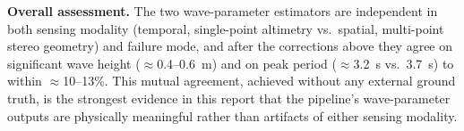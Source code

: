 \textbf{Overall assessment.} The two wave-parameter estimators are independent in both sensing modality (temporal, single-point altimetry vs.\ spatial, multi-point stereo geometry) and failure mode, and after the corrections above they agree on significant wave height ($\approx$0.4--0.6~m) and on peak period ($\approx$3.2~s vs.\ 3.7~s) to within $\approx$10--13\%. This mutual agreement, achieved without any external ground truth, is the strongest evidence in this report that the pipeline's wave-parameter outputs are physically meaningful rather than artifacts of either sensing modality.
